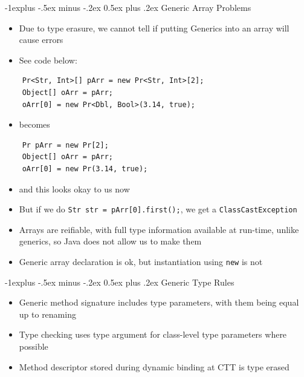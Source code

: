 \documentclass[10pt, landscape]{article}
\makeatletter
\renewcommand{\section}{\@startsection{section}{1}{0mm}%
                                {-1ex plus -.5ex minus -.2ex}%
                                {0.5ex plus .2ex}%
                                {\normalfont\large\bfseries}}
\renewcommand{\section}{\@startsection{section}{2}{0mm}%
                                {-1explus -.5ex minus -.2ex}%
                                {0.5ex plus .2ex}%
                                {\normalfont\normalsize\bfseries}}
\makeatother
\begin{document}
\begin{multicols*}{4}
\section{Generic Array Problems}
\begin{itemize}
    \item Due to type erasure, we cannot tell if putting Generics into an array will cause errors
    \item See code below:
\end{itemize}
\begin{lstlisting}
    Pr<Str, Int>[] pArr = new Pr<Str, Int>[2];
    Object[] oArr = pArr;
    oArr[0] = new Pr<Dbl, Bool>(3.14, true);
\end{lstlisting}
\begin{itemize}
    \item becomes
\end{itemize}
\begin{lstlisting}
    Pr pArr = new Pr[2];
    Object[] oArr = pArr;
    oArr[0] = new Pr(3.14, true);
\end{lstlisting}
\begin{itemize}
    \item and this looks okay to us now
    \item But if we do \lstinline{Str str = pArr[0].first();}, we get a \lstinline{ClassCastException}
    \item Arrays are reifiable, with full type information available at run-time, unlike generics, so Java does not allow us to make them
    \item Generic array declaration is ok, but instantiation using \lstinline{new} is not
\end{itemize}

\section{Generic Type Rules}
\begin{itemize}
    \item Generic method signature includes type parameters, with them being equal up to renaming
    \item Type checking uses type argument for class-level type parameters where possible
    \item Method descriptor stored during dynamic binding at CTT is type erased
\end{itemize}


\end{multicols*}
\end{document}
